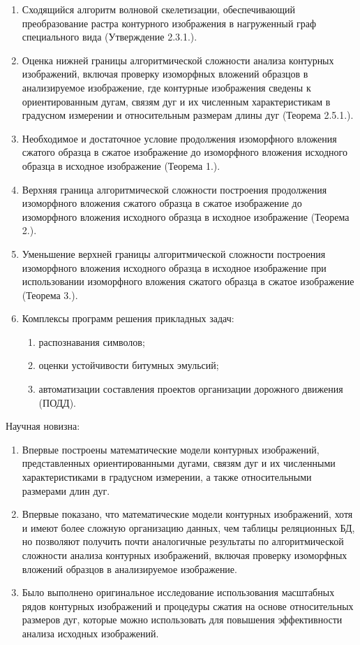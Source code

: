 \begin{enumerate}
	\item Сходящийся алгоритм волновой скелетизации,  обеспечивающий преобразование растра контурного изображения в нагруженный граф специального вида (Утверждение 2.3.1.).
	\item Оценка нижней границы алгоритмической сложности  анализа контурных изображений, включая проверку изоморфных вложений образцов в анализируемое изображение, где контурные изображения сведены к ориентированным дугам, связям дуг и их численным характеристикам в градусном измерении и  относительным размерам  длины дуг  (Теорема 2.5.1.).
	\item Необходимое и достаточное условие продолжения изоморфного вложения сжатого образца в сжатое изображение до изоморфного вложения исходного образца в исходное изображение  (Теорема 1.).
	\item Верхняя граница алгоритмической сложности построения продолжения изоморфного вложения сжатого образца в сжатое изображение до изоморфного вложения исходного образца в исходное изображение  (Теорема 2.).
	\item Уменьшение верхней границы алгоритмической сложности построения  изоморфного вложения исходного образца в исходное изображение при использовании изоморфного вложения сжатого образца в сжатое изображение  (Теорема 3.).
	\item Комплексы программ  решения прикладных задач:
	\begin{enumerate}
		\item распознавания символов;
		\item оценки устойчивости битумных эмульсий;
		\item автоматизации составления проектов организации дорожного движения (ПОДД). 
	\end{enumerate}
\end{enumerate}
\noindent
Научная новизна:
\begin{enumerate}
\item Впервые построены математические модели контурных изображений, представленных ориентированными дугами, связям дуг и их численными характеристиками в градусном измерении,  а также  относительными размерами  длин дуг.  
\item Впервые  показано, что математические модели контурных изображений, хотя и имеют более сложную организацию данных, чем  таблицы реляционных БД, но позволяют получить почти аналогичные результаты по алгоритмической сложности  анализа контурных изображений, включая проверку изоморфных вложений образцов в анализируемое изображение.
\item Было выполнено оригинальное исследование использования масштабных рядов контурных изображений и процедуры сжатия на  основе относительных размеров дуг, которые можно использовать для повышения эффективности анализа исходных изображений.
\end{enumerate}
